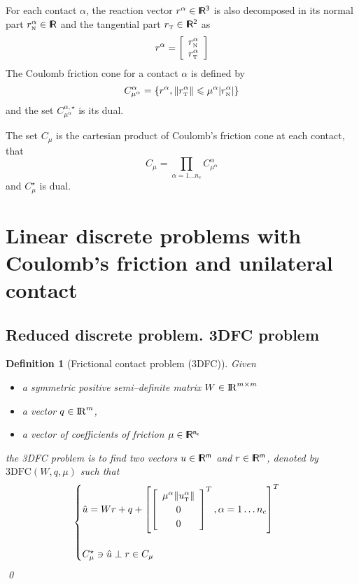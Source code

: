 \documentclass[a4paper,10pt]{article}
\begin{document}
For each contact $\alpha$, the reaction vector $r^\alpha\in \rm\sf I\!R^3$ is also decomposed in its normal part $r_{\hbox{\tiny{N}}}^{\alpha}\in \rm\sf I\!R$ and the tangential part $r_{\hbox{\tiny{T}}}\in\rm\sf I\!R^2$ as
\begin{equation}
  \label{eq:contactvelocity}
  r^\alpha = \left[
  \begin{array}{c}
    r^\alpha_{{\hbox{\tiny{N}}}} \\
    r^\alpha_{{\hbox{\tiny{T}}}}   
  \end{array}\right]
\end{equation}
The Coulomb friction cone for a  contact $\alpha$ is defined by 
\begin{equation}
  \label{eq:CCC}
  C_{\mu^\alpha}^{\alpha}  = \{r^\alpha, \|r^\alpha_{\hbox{\tiny{T}}} \| \leqslant \mu^\alpha |r^\alpha_{\hbox{\tiny{N}}}| \}
\end{equation}
and the set $C^{\alpha,\star}_{\mu^\alpha}$ is its dual.


The set $C_{\mu}$ is the cartesian product of Coulomb's friction cone at each contact, that 
\begin{equation}
  \label{eq:CC}
  C_{\mu} = \prod_{\alpha=1\ldots n_c} C_{\mu^\alpha}^{\alpha} 
\end{equation}
and $C^\star_{\mu}$ is dual.
\clearpage
\section{Linear discrete problems with Coulomb's friction and unilateral contact}


\newtheorem{definition}{Definition}

\subsection{Reduced discrete problem. 3DFC problem}
\begin{definition}[Frictional contact problem (3DFC)]
  Given
  \begin{itemize}
    \item a symmetric positive semi--definite  matrix ${W} \in \mathrm{I\!R}^{m \times m}$
    \item a vector $ {q} \in \mathrm{I\!R}^m$,
    \item a vector of coefficients of friction $\mu \in \rm\sf I\!R^{n_c}$
  \end{itemize}
 the  3DFC problem  is to find two vectors $u\in\rm\sf I\!R^m$ and $r\in \rm\sf I\!R^m$, denoted by $\mathrm{3DFC}(W,q,\mu)$  such that
\begin{equation}\label{eq:lcp1}
  \begin{cases}
    \hat u = W r + q +\left[
      \left[\begin{array}{c}
          \mu^\alpha \|u^\alpha_{\hbox{\tiny{T}}}\|\\
          0 \\
          0
        \end{array}\right]^T, \alpha = 1 \ldots n_c
    \right]^T \\ \\
    C^\star_{\mu} \ni {\hat u} \perp r \in C_{\mu}
  \end{cases}
\end{equation}
\qed
\end{definition}
\end{document}
